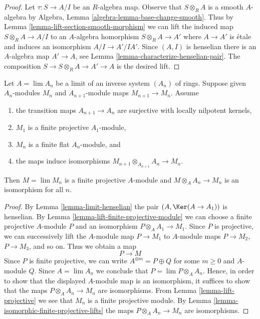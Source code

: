 \begin{proof}
Let $\tau : S \to A/I$ be an $R$-algebra map.
Observe that $S \otimes_R A$ is a smooth $A$-algebra by
Algebra, Lemma \ref{algebra-lemma-base-change-smooth}.
Thus by Lemma \ref{lemma-lift-section-smooth-morphism} we can lift
the induced map $S \otimes_R A \to A/I$ to an $A$-algebra
homorphism $S \otimes_R A \to A'$ where $A \to A'$ is \'etale
and induces an isomorphism $A/I \to A'/IA'$. Since $(A, I)$
is henselian there is an $A$-algebra map $A' \to A$, see
Lemma \ref{lemma-characterize-henselian-pair}.
The composition $S \to S \otimes_R A \to A' \to A$ is the
desired lift.
\end{proof}

\begin{lemma}
\label{lemma-lim-finite-projective-gives-finite-projective}
Let $A = \lim A_n$ be a limit of an inverse system $(A_n)$ of rings.
Suppose given $A_n$-modules $M_n$ and $A_{n + 1}$-module maps
$M_{n + 1} \to M_n$. Assume
\begin{enumerate}
\item the transition maps $A_{n + 1} \to A_n$ are surjective
with locally nilpotent kernels,
\item $M_1$ is a finite projective $A_1$-module,
\item $M_n$ is a finite flat $A_n$-module, and
\item the maps induce isomorphisms
$M_{n + 1} \otimes_{A_{n + 1}} A_n \to M_n$.
\end{enumerate}
Then $M = \lim M_n$ is a finite projective $A$-module
and $M \otimes_A A_n \to M_n$ is an isomorphism for all $n$.
\end{lemma}

\begin{proof}
By Lemma \ref{lemma-limit-henselian} the pair $(A, \Ker(A \to A_1))$ is
henselian. By Lemma \ref{lemma-lift-finite-projective-module}
we can choose a finite projective $A$-module $P$ and an isomorphism
$P \otimes_A A_1 \to M_1$. Since $P$ is projective, we can successively lift
the $A$-module map $P \to M_1$ to $A$-module maps
$P \to M_2$, $P \to M_3$, and so on. Thus we obtain a map
$$
P \longrightarrow M
$$
Since $P$ is finite projective, we can write $A^{\oplus m} = P \oplus Q$
for some $m \geq 0$ and $A$-module $Q$. Since $A = \lim A_n$ we conclude
that $P = \lim P \otimes_A A_n$. Hence, in order to show that the displayed
$A$-module map is an isomorphism, it suffices to show that the maps
$P \otimes_A A_n \to M_n$ are isomorphisms.
From Lemma \ref{lemma-lift-projective} we see that
$M_n$ is a finite projective module.
By Lemma \ref{lemma-isomorphic-finite-projective-lifts}
the maps $P \otimes_A A_n \to M_n$ are isomorphisms.
\end{proof}







